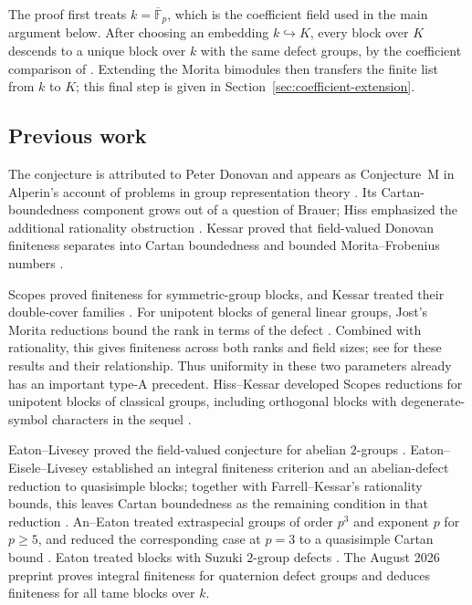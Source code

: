 The proof first treats \(k=\overline{\mathbb F}_p\), which is the
coefficient field used in the main argument below.  After choosing an
embedding \(k\hookrightarrow K\), every block over \(K\) descends to a
unique block over \(k\) with the same defect groups, by the coefficient
comparison of \cite[Section~2.1]{BlockwiseAlperinWeight}.  Extending the
Morita bimodules then transfers the finite list from \(k\) to \(K\);
this final step is given in Section~\ref{sec:coefficient-extension}.

\subsection{Previous work}

The conjecture is attributed to Peter Donovan and appears as
Conjecture~M in Alperin's account of problems in group representation
theory \cite{Alperin1980}.
Its Cartan-boundedness component grows out of a question of Brauer;
Hiss emphasized the additional rationality obstruction
\cite{HissBrauer}.  Kessar proved that field-valued Donovan
finiteness separates into Cartan boundedness and bounded
Morita--Frobenius numbers \cite{KessarRemark}.

Scopes proved finiteness for symmetric-group blocks, and Kessar
treated their double-cover families \cite{Scopes,KessarSymmetric}.
For unipotent blocks of general linear groups, Jost's Morita
reductions bound the rank in terms of the defect \cite{Jost}.
Combined with rationality, this gives
finiteness across both ranks and field sizes; see
\cite[Example~5.3(2)--(3)]{HissBrauer} for these results and their
relationship.  Thus uniformity in these two parameters already has
an important type-A precedent.  Hiss--Kessar developed Scopes
reductions for unipotent blocks of classical groups, including
orthogonal blocks with degenerate-symbol characters in the sequel
\cite{HissKessarScopes,HissKessarScopesII}.

Eaton--Livesey proved the field-valued conjecture for abelian
\(2\)-groups \cite{EatonLivesey}.  Eaton--Eisele--Livesey established
an integral finiteness criterion and an abelian-defect reduction to
quasisimple blocks; together with Farrell--Kessar's rationality
bounds, this leaves Cartan boundedness as the remaining condition
in that reduction \cite{EEL,FarrellKessar}.
An--Eaton treated extraspecial groups of order \(p^3\) and exponent
\(p\) for \(p\ge5\), and reduced the corresponding case at \(p=3\)
to a quasisimple Cartan bound \cite{AnEaton}.
Eaton treated blocks with Suzuki \(2\)-group defects
\cite{EatonSuzuki}.  The August 2026 preprint
\cite[Theorem~1.1 and Corollary~1.2]{Quaternion2026} proves
integral finiteness for quaternion defect groups and deduces
finiteness for all tame blocks over \(k\).

